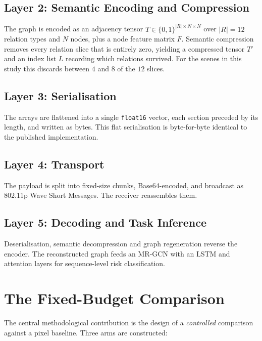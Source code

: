\documentclass{iutbscthesis}
\begin{document}
\subsection{Layer 2: Semantic Encoding and Compression}

The graph is encoded as an adjacency tensor
$T \in \{0,1\}^{|R| \times N \times N\!}$ over $|R| = 12$ relation types and
$N$ nodes, plus a node feature matrix $F$. Semantic compression removes every
relation slice that is entirely zero, yielding a compressed tensor $T'$ and an
index list $L$ recording which relations survived. For the scenes in this study
this discards between $4$ and $8$ of the $12$ slices.

\subsection{Layer 3: Serialisation}

The arrays are flattened into a single \texttt{float16} vector, each section
preceded by its length, and written as bytes. This flat serialisation is
byte-for-byte identical to the published implementation.

\subsection{Layer 4: Transport}

The payload is split into fixed-size chunks, Base64-encoded, and broadcast as
802.11p Wave Short Messages. The receiver reassembles them.

\subsection{Layer 5: Decoding and Task Inference}

Deserialisation, semantic decompression and graph regeneration reverse the
encoder. The reconstructed graph feeds an MR-GCN with an LSTM and attention
layers for sequence-level risk classification.

\section{The Fixed-Budget Comparison}

The central methodological contribution is the design of a \emph{controlled}
comparison against a pixel baseline. Three arms are constructed:
\end{document}

